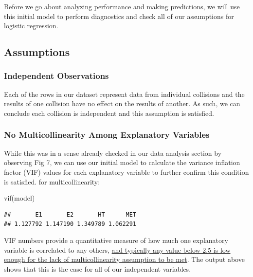 \documentclass[
]{article}
\newenvironment{Shaded}{\begin{snugshade}}{\end{snugshade}}
\newcommand{\FunctionTok}[1]{\textcolor[rgb]{0.00,0.00,0.00}{#1}}
\newcommand{\NormalTok}[1]{#1}
\begin{document}
Before we go about analyzing performance and making predictions, we will
use this initial model to perform diagnostics and check all of our
assumptions for logistic regression.

\hypertarget{assumptions}{%
\subsection{Assumptions}\label{assumptions}}

\hypertarget{independent-observations}{%
\subsubsection{Independent
Observations}\label{independent-observations}}

Each of the rows in our dataset represent data from individual
collisions and the results of one collision have no effect on the
results of another. As such, we can conclude each collision is
independent and this assumption is satisfied.

\hypertarget{no-multicollinearity-among-explanatory-variables}{%
\subsubsection{No Multicollinearity Among Explanatory
Variables}\label{no-multicollinearity-among-explanatory-variables}}

While this was in a sense already checked in our data analysis section
by observing Fig 7, we can use our initial model to calculate the
variance inflation factor (VIF) values for each explanatory variable to
further confirm this condition is satisfied. for multicollinearity:

\begin{Shaded}
\begin{Highlighting}[]
\FunctionTok{vif}\NormalTok{(model)}
\end{Highlighting}
\end{Shaded}

\begin{verbatim}
##       E1       E2       HT      MET 
## 1.127792 1.147190 1.349789 1.062291
\end{verbatim}

VIF numbers provide a quantitative measure of how much one explanatory
variable is correlated to any others,
\href{https://www.ncbi.nlm.nih.gov/pmc/articles/PMC5993839/}{and
typically any value below 2.5 is low enough for the lack of
multicollinearity assumption to be met}. The output above shows that
this is the case for all of our independent variables.
\end{document}
